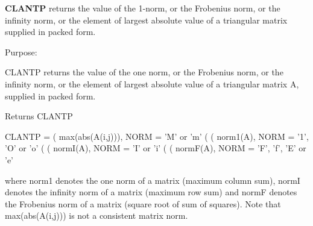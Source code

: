 {\bfseries C\+L\+A\+N\+T\+P} returns the value of the 1-\/norm, or the Frobenius norm, or the infinity norm, or the element of largest absolute value of a triangular matrix supplied in packed form. 

 \begin{DoxyParagraph}{Purpose\+: }
\begin{DoxyVerb} CLANTP  returns the value of the one norm,  or the Frobenius norm, or
 the  infinity norm,  or the  element of  largest absolute value  of a
 triangular matrix A, supplied in packed form.\end{DoxyVerb}

\end{DoxyParagraph}
\begin{DoxyReturn}{Returns}
C\+L\+A\+N\+T\+P \begin{DoxyVerb}    CLANTP = ( max(abs(A(i,j))), NORM = 'M' or 'm'
             (
             ( norm1(A),         NORM = '1', 'O' or 'o'
             (
             ( normI(A),         NORM = 'I' or 'i'
             (
             ( normF(A),         NORM = 'F', 'f', 'E' or 'e'

 where  norm1  denotes the  one norm of a matrix (maximum column sum),
 normI  denotes the  infinity norm  of a matrix  (maximum row sum) and
 normF  denotes the  Frobenius norm of a matrix (square root of sum of
 squares).  Note that  max(abs(A(i,j)))  is not a consistent matrix norm.\end{DoxyVerb}
 
\end{DoxyReturn}

